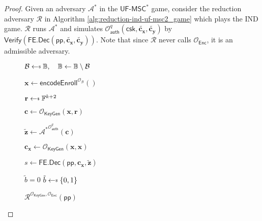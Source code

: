 \begin{proof}
\label{proof:ind-uf-msc2}
	Given an adversary $\mathcal{A}^*$ in the $\textsf{UF-MSC}^*$ game, consider the reduction adversary $\mathcal{R}$ in Algorithm \ref{alg:reduction-ind-uf-msc2_game} which plays the \textsf{IND} game. $\mathcal{R}$ runs $\mathcal{A}^*$ and simulates $\mathcal{O}_{\textsf{auth}}^q (\textsf{csk}, \mathbf{\tilde{c_x}}, \mathbf{\tilde{c_y}})$ by $\textsf{Verify}( \textsf{FE.Dec}(\textsf{pp}, \mathbf{\tilde{c_x}}, \mathbf{\tilde{c_y}}) )$. Note that since $\mathcal{R}$ never calls $\mathcal{O}_{\textsf{Enc}}$, it is an admissible adversary.

\begin{figure}[h]
\centering
	
	\begin{minipage}[t]{0.5\linewidth}
	\centering
	\begin{algorithm}[H]
		\caption{$\mathcal{R}^{\mathcal{O}_{\textsf{KeyGen}}, \mathcal{O}_{\textsf{Enc}}}(\textsf{pp})$}
	\label{alg:reduction-ind-uf-msc2_game}
	\begin{algorithmic}[1]
		\State $\mathcal{B} \getsdollar \mathbb{B}, \quad \mathbb{B} \gets \mathbb{B} \setminus \mathcal{B}$

		\State $\mathbf{x} \gets \textsf{encodeEnroll}^{\mathcal{O}_{\mathcal{B}}}()$

		\State $\mathbf{r} \getsdollar \mathbb{F}^{k+2}$
		
		\State $\mathbf{c} \gets \mathcal{O}_{\textsf{KeyGen}}(\mathbf{x}, \mathbf{r})$ \label{alg:reduction-ind-uf-msc2_game:c}

		\State ${\mathbf{\tilde{z}}} \gets {\mathcal{A}^*}^{\mathcal{O}_\textsf{auth}^q} ( \mathbf{c} )$

		\State $\mathbf{c_x} \gets \mathcal{O}_{\textsf{KeyGen}}(\mathbf{x}, \mathbf{x})$

		\State $s \gets \textsf{FE.Dec}( \textsf{pp}, \mathbf{c_x}, \mathbf{\tilde{z}} )$

		 \label{alg:reduction-ind-uf-msc2_game:verify}
			\State \Return $\tilde{b} = 0$
		\Else
			\State \Return $\tilde{b} \getsdollar \{0, 1\}$
		\EndIf

	\end{algorithmic}
	\end{algorithm}
	\end{minipage}
	
\label{fig:reduction-ind-uf-msc2_game}
\end{figure}


\end{proof}
